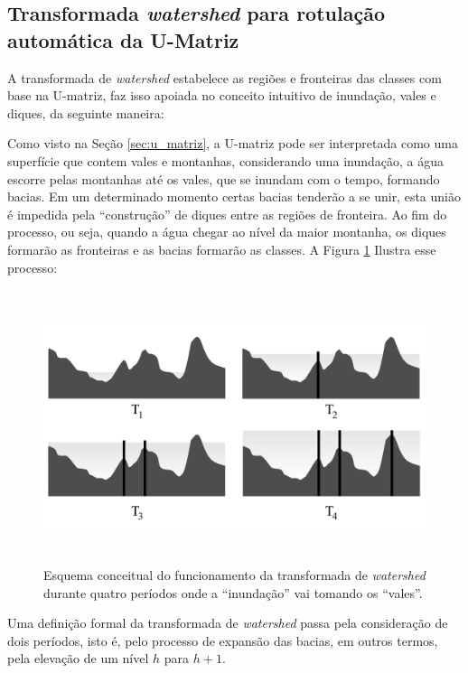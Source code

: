 \subsection{Transformada \textit{watershed} para rotulação automática
da U-Matriz}\label{sec:watershed}

A transformada de \textit{watershed} estabelece as regiões e fronteiras das
classes com base na U-matriz, faz isso apoiada no conceito intuitivo de
inundação, vales e diques, da seguinte maneira:

Como visto na Seção \ref{sec:u_matriz}, a U-matriz pode ser interpretada como
uma superfície que contem vales e montanhas, considerando uma inundação, a água
escorre pelas montanhas até os vales, que se inundam com o tempo, formando
bacias. Em um determinado momento certas bacias tenderão a se unir, esta união
é impedida pela “construção” de diques entre as regiões de fronteira. Ao fim do
processo, ou seja, quando a água chegar ao nível da maior montanha, os diques
formarão as fronteiras e as bacias formarão as classes. A Figura
\ref{fig:tempo_inundacao} Ilustra esse processo:

\begin{figure}[H]
  \begin{center}
    \includegraphics[height=8cm]{imagens/diques_tempo.pdf}
  \end{center}
  \caption{ Esquema conceitual do funcionamento da transformada de
    \textit{watershed} durante quatro períodos onde a “inundação” vai
    tomando os “vales”. }
  \label{fig:tempo_inundacao}
\end{figure}

Uma definição formal da transformada de \textit{watershed} passa pela
consideração de dois períodos, isto é, pelo processo de expansão das bacias, em
outros termos, pela elevação de um nível $ h $ para $ h + 1 $.

